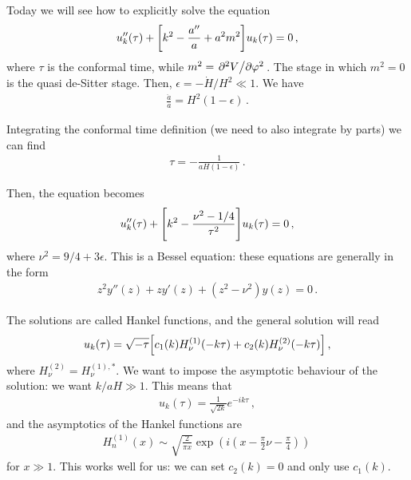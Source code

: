 \documentclass[main.tex]{subfiles}
\begin{document}

Today we will see how to explicitly solve the equation 
%
\begin{align}
u''_k (\tau )
+ 
\qty[k^2 - \frac{a''}{a} + a^2 m^2] u_k (\tau ) = 0
\,,
\end{align}
%
where \(\tau \) is the conformal time, while \(m^2 = \pdv*[2]{V}{\varphi }\). 
The stage in which \(m^2 = 0\) is the quasi de-Sitter stage. 
Then, \(\epsilon = - \dot{H} / H^2 \ll 1\). 
We have 
%
\begin{align}
\frac{\ddot{a}}{a} = H^2 ( 1- \epsilon )
\,.
\end{align}

Integrating the conformal time definition (we need to also integrate by parts) we can find 
%
\begin{align}
\tau = - \frac{1}{a H (1 - \epsilon )}
\,.
\end{align}

Then, the equation becomes 
%
\begin{align}
u''_k(\tau ) + \qty[k^2 - \frac{\nu^2 - 1/4}{\tau^2}] u_k (\tau )= 0 
\,,
\end{align}
%
where \(\nu^2 = 9/4 + 3 \epsilon \). 
This is a Bessel equation: these equations are generally in the form 
%
\begin{align}
z^2 y'' (z) + z y' (z) + (z^2 - \nu^2) y(z) = 0
\,.
\end{align}

The solutions are called Hankel functions, and the general solution will read 
%
\begin{align}
u_k (\tau ) = \sqrt{- \tau } \qty[ c_1 (k) H_\nu^{(1)} (-k\tau ) + c_2 (k) H_\nu^{(2)} (-k\tau )]
\,,
\end{align}
%
where \(H^{(2)}_\nu = H^{(1), *}_\nu\). 
We want to impose the asymptotic behaviour of the solution: we want \(k / aH \gg 1\). 
This means that 
%
\begin{align}
u_k (\tau ) = \frac{1}{\sqrt{2k}} e^{-ik \tau }
\,,
\end{align}
%
and the asymptotics of the Hankel functions are
%
\begin{align}
H^{(1)}_n (x) \sim \sqrt{ \frac{2}{\pi x}} \exp(i (x - \frac{\pi}{2} \nu - \frac{\pi}{4}))
\,
\end{align}
%
for \(x \gg 1\). This works well for us: we can set \(c_2 (k) = 0\) and only use \(c_1 (k)\). 
\end{document}
